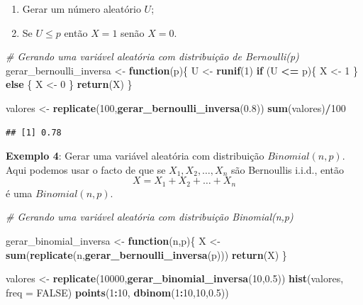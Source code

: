 \documentclass[
]{book}
\newenvironment{Shaded}{\begin{snugshade}}{\end{snugshade}}
\newcommand{\AttributeTok}[1]{\textcolor[rgb]{0.13,0.29,0.53}{#1}}
\newcommand{\CommentTok}[1]{\textcolor[rgb]{0.56,0.35,0.01}{\textit{#1}}}
\newcommand{\ConstantTok}[1]{\textcolor[rgb]{0.56,0.35,0.01}{#1}}
\newcommand{\ControlFlowTok}[1]{\textcolor[rgb]{0.13,0.29,0.53}{\textbf{#1}}}
\newcommand{\DecValTok}[1]{\textcolor[rgb]{0.00,0.00,0.81}{#1}}
\newcommand{\FloatTok}[1]{\textcolor[rgb]{0.00,0.00,0.81}{#1}}
\newcommand{\FunctionTok}[1]{\textcolor[rgb]{0.13,0.29,0.53}{\textbf{#1}}}
\newcommand{\NormalTok}[1]{#1}
\newcommand{\OtherTok}[1]{\textcolor[rgb]{0.56,0.35,0.01}{#1}}
\newcommand{\SpecialCharTok}[1]{\textcolor[rgb]{0.81,0.36,0.00}{\textbf{#1}}}
\providecommand{\tightlist}{%
  \setlength{\itemsep}{0pt}\setlength{\parskip}{0pt}}
\begin{document}
\begin{enumerate}
\def\labelenumi{\arabic{enumi}.}
\tightlist
\item
  Gerar um número aleatório \(U\);
\item
  Se \(U \leq p\) então \(X=1\) senão \(X=0\).
\end{enumerate}

\begin{Shaded}
\begin{Highlighting}[]
\CommentTok{\# Gerando uma variável aleatória com distribuição de Bernoulli(p)}
\NormalTok{gerar\_bernoulli\_inversa }\OtherTok{\textless{}{-}} \ControlFlowTok{function}\NormalTok{(p)\{}
\NormalTok{  U }\OtherTok{\textless{}{-}} \FunctionTok{runif}\NormalTok{(}\DecValTok{1}\NormalTok{)}
  \ControlFlowTok{if}\NormalTok{ (U }\SpecialCharTok{\textless{}=}\NormalTok{ p)\{}
\NormalTok{    X }\OtherTok{\textless{}{-}} \DecValTok{1}
\NormalTok{  \} }\ControlFlowTok{else}\NormalTok{ \{}
\NormalTok{    X }\OtherTok{\textless{}{-}} \DecValTok{0}
\NormalTok{  \}}
  \FunctionTok{return}\NormalTok{(X)}
\NormalTok{\}}

\NormalTok{valores }\OtherTok{\textless{}{-}} \FunctionTok{replicate}\NormalTok{(}\DecValTok{100}\NormalTok{,}\FunctionTok{gerar\_bernoulli\_inversa}\NormalTok{(}\FloatTok{0.8}\NormalTok{))}
\FunctionTok{sum}\NormalTok{(valores)}\SpecialCharTok{/}\DecValTok{100}
\end{Highlighting}
\end{Shaded}

\begin{verbatim}
## [1] 0.78
\end{verbatim}

\textbf{Exemplo 4}: Gerar uma variável aleatória com distribuição
\(Binomial(n,p)\). Aqui podemos usar o facto de que se
\(X_{1},X_{2},\ldots,X_{n}\) são Bernoullis i.i.d., então
\[X = X_{1}+X_{2}+\ldots+X_{n}\] é uma \(Binomial(n,p)\).

\begin{Shaded}
\begin{Highlighting}[]
\CommentTok{\# Gerando uma variável aleatória com distribuição Binomial(n,p)}

\NormalTok{gerar\_binomial\_inversa }\OtherTok{\textless{}{-}} \ControlFlowTok{function}\NormalTok{(n,p)\{}
\NormalTok{  X }\OtherTok{\textless{}{-}} \FunctionTok{sum}\NormalTok{(}\FunctionTok{replicate}\NormalTok{(n,}\FunctionTok{gerar\_bernoulli\_inversa}\NormalTok{(p)))}
  \FunctionTok{return}\NormalTok{(X)}
\NormalTok{\}}

\NormalTok{valores }\OtherTok{\textless{}{-}} \FunctionTok{replicate}\NormalTok{(}\DecValTok{10000}\NormalTok{,}\FunctionTok{gerar\_binomial\_inversa}\NormalTok{(}\DecValTok{10}\NormalTok{,}\FloatTok{0.5}\NormalTok{))}
\FunctionTok{hist}\NormalTok{(valores, }\AttributeTok{freq =} \ConstantTok{FALSE}\NormalTok{)}
\FunctionTok{points}\NormalTok{(}\DecValTok{1}\SpecialCharTok{:}\DecValTok{10}\NormalTok{, }\FunctionTok{dbinom}\NormalTok{(}\DecValTok{1}\SpecialCharTok{:}\DecValTok{10}\NormalTok{,}\DecValTok{10}\NormalTok{,}\FloatTok{0.5}\NormalTok{))}
\end{Highlighting}
\end{Shaded}
\end{document}
